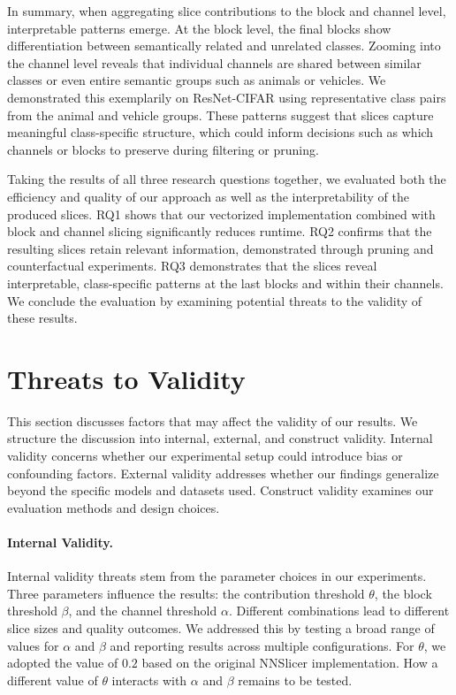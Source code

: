 \documentclass[
12pt,
fancyheadings,
a4paper,
twoside,
BCOR=0.7cm,
nobcorignoretitle,
grayscalebody,
]{stsreprt}
\begin{document}
In summary, when aggregating slice contributions to the block and channel level, interpretable
patterns emerge. At the block level, the final blocks show differentiation between semantically
related and unrelated classes. Zooming into the channel level reveals that individual channels are
shared between similar classes or even entire semantic groups such as animals or vehicles. We
demonstrated this exemplarily on ResNet-CIFAR using representative class pairs from the animal and
vehicle groups. These patterns suggest that slices capture meaningful class-specific structure,
which could inform decisions such as which channels or blocks to preserve during filtering or
pruning.

\vspace{0.2cm}

Taking the results of all three research questions together, we evaluated both the efficiency and
quality of our approach as well as the interpretability of the produced slices.
RQ1 shows that our vectorized implementation combined with block and channel slicing significantly
reduces runtime.
RQ2 confirms that the resulting slices retain relevant information, demonstrated through pruning
and counterfactual experiments.
RQ3 demonstrates that the slices reveal interpretable, class-specific patterns at the last blocks
and within their channels.
We conclude the evaluation by examining potential threats to the validity of these results.

\section{Threats to Validity}

This section discusses factors that may affect the validity of our results.
We structure the discussion into internal, external, and construct validity.
Internal validity concerns whether our experimental setup could introduce bias or confounding
factors.
External validity addresses whether our findings generalize beyond the specific models and datasets
used.
Construct validity examines our evaluation methods and design choices.

\paragraph{Internal Validity.}
Internal validity threats stem from the parameter choices in our experiments.
Three parameters influence the results: the contribution threshold $\theta$, the block threshold
$\beta$, and the channel threshold $\alpha$.
Different combinations lead to different slice sizes and quality outcomes.
We addressed this by testing a broad range of values for $\alpha$ and $\beta$ and reporting results
across multiple configurations.
For $\theta$, we adopted the value of $0.2$ based on the original NNSlicer implementation.
How a different value of $\theta$ interacts with $\alpha$ and $\beta$ remains to be tested.
\end{document}
